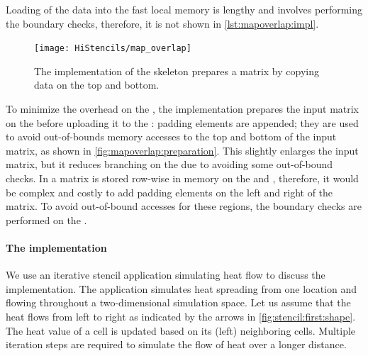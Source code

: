Loading of the data into the fast local memory is lengthy and involves performing the boundary checks, therefore, it is not shown in \autoref{lst:mapoverlap:impl}.
%
\begin{figure}
  \begin{centering}
    \texttt{[image: HiStencils/map\_overlap]}
    \caption{The  implementation of the \stencil skeleton prepares a matrix by copying data on the top and bottom.}
    \label{fig:mapoverlap:preparation}
    \vspace{-.5em}
  \end{centering}
\end{figure}
%
To minimize the overhead on the \GPU, the  implementation prepares the input matrix on the \CPU before uploading it to the \GPU:
padding elements are appended; they are used to avoid out-of-bounds memory accesses to the top and bottom of the input matrix, as shown in \autoref{fig:mapoverlap:preparation}.
This slightly enlarges the input matrix, but it reduces branching on the \GPU due to avoiding some out-of-bound checks.
In \SkelCL a matrix is stored row-wise in memory on the \CPU and \GPU, therefore, it would be complex and costly to add padding elements on the left and right of the matrix.
To avoid out-of-bound accesses for these regions, the boundary checks are performed on the \GPU.

\paragraph{The  implementation}

We use an iterative stencil application simulating heat flow to discuss the  implementation.
The application simulates heat spreading from one location and flowing throughout a two-dimensional simulation space.
Let us assume that the heat flows from left to right as indicated by the arrows in \autoref{fig:stencil:first:shape}.
The heat value of a cell is updated based on its (left) neighboring cells.
Multiple iteration steps are required to simulate the flow of heat over a longer distance.

